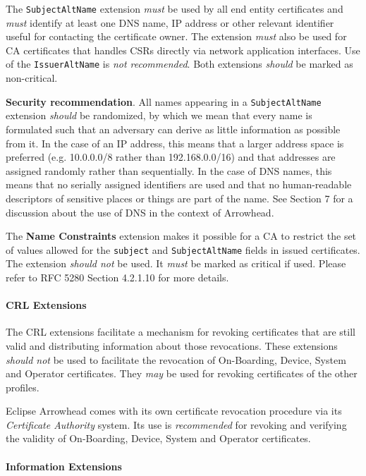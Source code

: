 The \texttt{SubjectAltName} extension \textit{must} be used by all end entity certificates and \textit{must} identify at least one DNS name, IP address or other relevant identifier useful for contacting the certificate owner.
The extension \textit{must} also be used for CA certificates that handles CSRs directly via network application interfaces.
Use of the \texttt{IssuerAltName} is \textit{not recommended}.
Both extensions \textit{should} be marked as non-critical.

\textbf{Security recommendation}.
All names appearing in a \texttt{SubjectAltName} extension \textit{should} be randomized, by which we mean that every name is formulated such that an adversary can derive as little information as possible from it.
In the case of an IP address, this means that a larger address space is preferred (e.g. 10.0.0.0/8 rather than 192.168.0.0/16) and that addresses are assigned randomly rather than sequentially.
In the case of DNS names, this means that no serially assigned identifiers are used and that no human-readable descriptors of sensitive places or things are part of the name.
See Section 7 for a discussion about the use of DNS in the context of Arrowhead.

The \textbf{Name Constraints} extension makes it possible for a CA to restrict the set of values allowed for the \texttt{subject} and \texttt{SubjectAltName} fields in issued certificates.
The extension \textit{should not} be used.
It \textit{must} be marked as critical if used.
Please refer to RFC 5280 Section 4.2.1.10 for more details.

\paragraph{CRL Extensions}

The CRL extensions facilitate a mechanism for revoking certificates that are still valid and distributing information about those revocations.
These extensions \textit{should not} be used to facilitate the revocation of On-Boarding, Device, System and Operator certificates.
They \textit{may} be used for revoking certificates of the other profiles.

Eclipse Arrowhead comes with its own certificate revocation procedure via its \textit{Certificate Authority} system.
Its use is \textit{recommended} for revoking and verifying the validity of On-Boarding, Device, System and Operator certificates.

\paragraph{Information Extensions}

